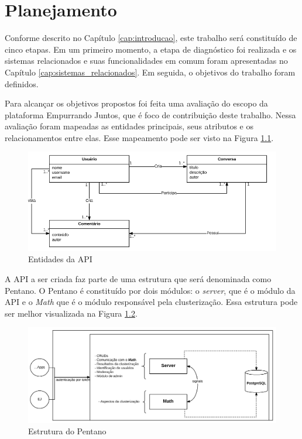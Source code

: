 \chapter{Planejamento}
Conforme descrito no Capítulo \ref{cap:introducao}, este trabalho será constituído de cinco etapas.
Em um primeiro momento, a etapa de diagnóstico foi realizada e os sistemas relacionados e suas funcionalidades em comum foram apresentadas no Capítulo \ref{cap:sistemas_relacionados}. Em seguida, o objetivos do trabalho foram definidos. 

Para alcançar os objetivos propostos foi feita uma avaliação do escopo da plataforma Empurrando Juntos, que é foco de contribuição deste trabalho.
Nessa avaliação foram mapeadas as entidades principais, seus atributos e os relacionamentos entre elas. Esse mapeamento pode ser visto na Figura \ref{fig:entidades}.

\begin{figure}[h!]
\centering
\includegraphics[scale=0.5]{figuras/entidades.png}
\caption{Entidades da API}
\label{fig:entidades}
\end{figure}


A API a ser criada faz parte de uma estrutura que será denominada como Pentano. O Pentano é constituído por dois módulos: o \textit{server}, que é o módulo da API
e o \textit{Math} que é o módulo responsável pela clusterização. Essa estrutura pode ser melhor visualizada na Figura \ref{fig:pentano}.


\begin{figure}[h!]
\centering
\includegraphics[scale=0.5]{figuras/esquema_pentano.png}
\caption{Estrutura do Pentano}
\label{fig:pentano}
\end{figure}